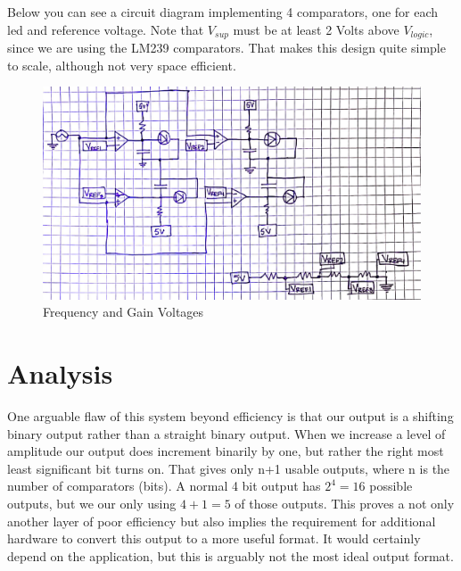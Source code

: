 \documentclass[prb,preprint]{revtex4-1}
\begin{document}
Below you can see a circuit diagram implementing 4 comparators, one for each led and reference voltage. Note that $V_{sup}$ must be at least 2 Volts above $V_{logic}$, since we are using the LM239 comparators. That makes this design quite simple to scale, although not very space efficient.

\begin{figure}[ht]
	\centering
	\includegraphics[width=5in]{fullSchem.png}
	\caption{Frequency and Gain Voltages}
	\label{fig1}
\end{figure}

\section{Analysis}
One arguable flaw of this system beyond efficiency is that our output is a shifting binary output rather than a straight binary output. When we increase a level of amplitude our output does increment binarily by one, but rather the right most least significant bit turns on. That gives only n+1 usable outputs, where n is the number of comparators (bits). A normal 4 bit output has $2^{4} = 16$ possible outputs, but we our only using $4+1=5$ of those outputs. This proves a not only another layer of poor efficiency but also implies the requirement for additional hardware to convert this output to a more useful format. It would certainly depend on the application, but this is arguably not the most ideal output format.

\end{document}
